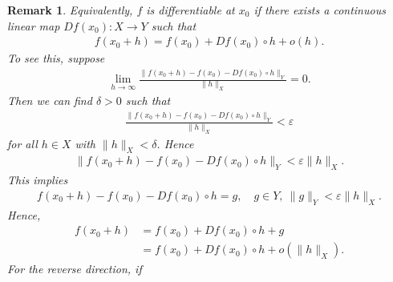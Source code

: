 \documentclass[12pt,reqno]{amsart}
\numberwithin{equation}{section}  %
\newcommand{\ee}{\varepsilon}
\newtheorem{remark}[theorem]{Remark}
\begin{document}
  \begin{framed}
  \begin{remark}
    Equivalently, $f$ is differentiable at $x_{0}$ if there exists a continuous
    linear map $Df(x_{0}): X \to Y$ such that
    \begin{equation*}
    \begin{split}
      f(x_{0} + h) = f(x_{0}) + Df(x_{0}) \circ h + o(h).
    \end{split}
    \end{equation*}
    To see this, suppose
    \begin{equation*}
    \begin{split}
      \lim_{h \to \infty} \frac{\| f(x_{0} + h) - f(x_{0}) - Df(x_{0}) \circ h
      \|_{Y}}{\| h \|_{X}} = 0.
    \end{split}
    \end{equation*}
    Then we can find $\delta > 0$ such that
    \begin{equation*}
    \begin{split}
    \frac{\| f(x_{0} + h) - f(x_{0}) - Df(x_{0}) \circ h
      \|_{Y}}{\| h \|_{X}}  < \ee
    \end{split}
    \end{equation*}
    for all $h \in X$ with $\| h \|_{X} < \delta$. Hence
    \begin{equation*}
    \begin{split}
      \| f(x_{0} + h) - f(x_{0}) - Df(x_{0}) \circ h \|_{Y} < \ee \| h
      \|_{X}.
    \end{split}
    \end{equation*}
    This implies
    \begin{equation*}
    \begin{split}
      f(x_{0} + h) - f(x_{0}) - Df(x_{0}) \circ h = g, \quad g \in Y, \ \| g
      \|_{Y} < \ee \| h \|_{X}.
    \end{split}
    \end{equation*}
    Hence, 
    \begin{equation*}
    \begin{split}
      f(x_{0} + h) 
      & = f(x_{0}) + Df(x_{0}) \circ h + g
      \\
      & =  f(x_{0}) + Df(x_{0})\circ h + o(\| h \|_{X}).
    \end{split}
    \end{equation*}
    For the reverse direction, if

\end{remark}
\end{framed}
\end{document}
